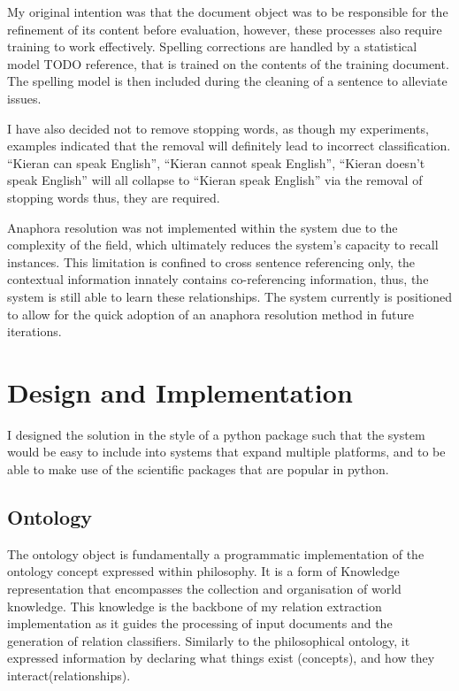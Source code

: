 \documentclass[11pt]{article} %
\begin{document}
My original intention was that the document object was to be responsible for the refinement of its content before evaluation, however, these processes also require training to work effectively. Spelling corrections are handled by a statistical model TODO reference, that is trained on the contents of the training document. The spelling model is then included during the cleaning of a sentence to alleviate issues. 

I have also decided not to remove stopping words, as though my experiments, examples indicated that the removal will definitely lead to incorrect classification. “Kieran can speak English”, “Kieran cannot speak English”, “Kieran doesn’t speak English” will all collapse to “Kieran speak English” via the removal of stopping words thus, they are required.

Anaphora resolution was not implemented within the system due to the complexity of the field, which ultimately reduces the system’s capacity to recall instances. This limitation is confined to cross sentence referencing only, the contextual information innately contains co-referencing information, thus, the system is still able to learn these relationships. The system currently is positioned to allow for the quick adoption of an anaphora resolution method in future iterations.

\section{Design and Implementation}

I designed the solution in the style of a python package such that the system would be easy to include into systems that expand multiple platforms, and to be able to make use of the scientific packages that are popular in python.

\subsection{Ontology}

The ontology object is fundamentally a programmatic implementation of the ontology concept expressed within philosophy. It is a form of Knowledge representation that encompasses the collection and organisation of world knowledge. This knowledge is the backbone of my relation extraction implementation as it guides the processing of input documents and the generation of relation classifiers. Similarly to the philosophical ontology, it expressed information by declaring what things exist (concepts), and how they interact(relationships).
\end{document}

